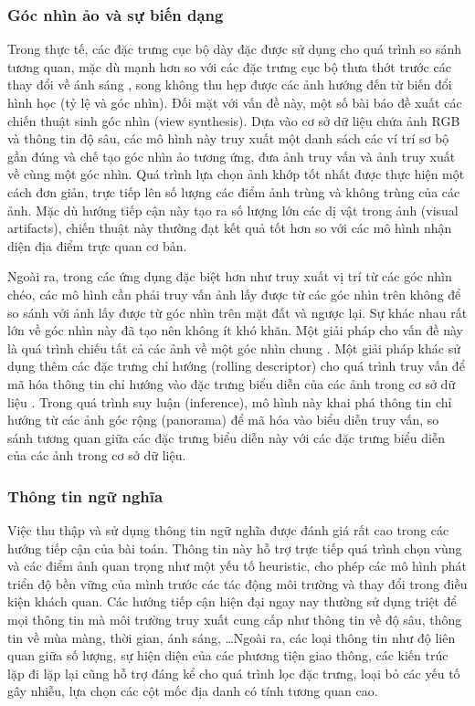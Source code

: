 \subsubsection{Góc nhìn ảo và sự biến dạng}

Trong thực tế, các đặc trưng cục bộ dày đặc được sử dụng cho quá trình so sánh tương quan, mặc dù mạnh hơn so với các đặc trưng cục bộ thưa thớt trước các thay đổi về ánh sáng \cite{zhou2016evaluating}, song không thu hẹp được các ảnh hướng đến từ biến đổi hình học (tỷ lệ và góc nhìn). Đối mặt với vấn đề này, một số bài báo \cite{torii201524, taira2018inloc} đề xuất các chiến thuật sinh góc nhìn (view synthesis). Dựa vào cơ sở dữ liệu chứa ảnh RGB và thông tin độ sâu, các mô hình này truy xuất một danh sách các ví trí sơ bộ gần đúng và chế tạo góc nhìn ảo tương ứng, đưa ảnh truy vấn và ảnh truy xuất về cùng một góc nhìn. Quá trình lựa chọn ảnh khớp tốt nhất được thực hiện một cách đơn giản, trực tiếp lên số lượng các điểm ảnh trùng và không trùng của các ảnh. Mặc dù hướng tiếp cận này tạo ra số lượng lớn các dị vật trong ảnh (visual artifacts), chiến thuật này thường đạt kết quả tốt hơn so với các mô hình nhận diện địa điểm trực quan cơ bản.

Ngoài ra, trong các ứng dụng đặc biệt hơn như truy xuất vị trí từ các góc nhìn chéo, các mô hình cần phải truy vấn ảnh lấy được từ các góc nhìn trên không để so sánh với ảnh lấy được từ góc nhìn trên mặt đất và ngược lại. Sự khác nhau rất lớn về góc nhìn này đã tạo nên không ít khó khăn. Một giải pháp cho vấn đề này là quá trình chiếu tất cả các ảnh về một góc nhìn chung \cite{lin2015learning, castaldo2015semantic}. Một giải pháp khác sử dụng thêm các đặc trưng chỉ hướng (rolling descriptor) cho quá trình truy vấn để mã hóa thông tin chỉ hướng vào đặc trưng biểu diễn của các ảnh trong cơ sở dữ liệu \cite{xia2023convolutional}. Trong quá trình suy luận (inference), mô hình này khai phá thông tin chỉ hướng từ các ảnh góc rộng (panorama) để mã hóa vào biểu diễn truy vấn, so sánh tương quan giữa các đặc trưng biểu diễn này với các đặc trưng biểu diễn của các ảnh trong cơ sở dữ liệu.

\subsubsection{Thông tin ngữ nghĩa}

Việc thu thập và sử dụng thông tin ngữ nghĩa được đánh giá rất cao trong các hướng tiếp cận của bài toán. Thông tin này hỗ trợ trực tiếp quá trình chọn vùng và các điểm ảnh quan trọng như một yếu tố heuristic, cho phép các mô hình phát triển độ bền vững của mình trước các tác động môi trường và thay đổi trong điều kiện khách quan. Các hướng tiếp cận hiện đại ngay nay thường sử dụng triệt để mọi thông tin mà môi trường truy xuất cung cấp như thông tin về độ sâu, thông tin về mùa màng, thời gian, ánh sáng, \dots Ngoài ra, các loại thông tin như độ liên quan giữa số lượng, sự hiện diện của các phương tiện giao thông, các kiến trúc lặp đi lặp lại cũng hỗ trợ đáng kể cho quá trình lọc đặc trưng, loại bỏ các yếu tố gây nhiễu, lựa chọn các cột mốc địa danh có tính tương quan cao.


